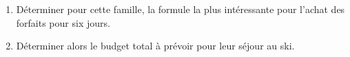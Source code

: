 \begin{enumerate}
	\item Déterminer pour cette famille, la formule la plus intéressante pour l'achat des forfaits pour six jours.
	
	\item Déterminer alors le budget total à prévoir pour leur séjour au ski.
\end{enumerate}
